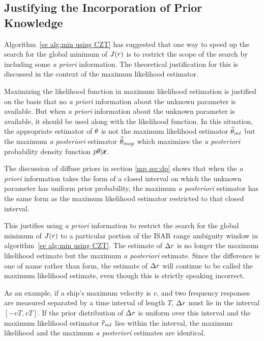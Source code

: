 \subsection{Justifying the Incorporation of Prior Knowledge}

Algorithm~\ref{ee alg:min using CZT} has suggested that one way to speed up 
the search for the global minimum of $J({r})$ is to restrict the scope of the 
search by including some {\em a priori\/} information.  The theoretical
justification for this is discussed in the context of the maximum 
likelihood estimator.

Maximizing the likelihood function in maximum likelihood estimation is
justified on the basis that no {\em a priori\/} information about the
unknown parameter is available.  But when {\em a priori\/} information about
the unknown parameter is available, it should be used along with the
likelihood function.  In this situation, the appropriate estimator
of $\theta$ is not the maximum likelihood estimator $\widehat{\theta}_{ml}$ but the maximum {\em
a posteriori\/} estimator $\widehat{\theta}_{map}$ which maximizes the {\em a posteriori\/}
probability density function ${p}{\theta|\bm{x}}$. 

The discussion of diffuse priors in section \ref{mp sec:dp} shows that when
the {\em a priori\/} information takes the form of a closed interval on
which the unknown parameter has uniform prior probability, the maximum {\em
a posteriori\/} estimator has the same form as the maximum likelihood
estimator restricted to that closed interval.

This justifies using {\em a priori\/} information to restrict the search
for the global minimum of $J({r})$ to a particular portion of the ISAR range
ambiguity window in algorithm~\ref{ee alg:min using CZT}.  The estimate of
${\Delta r}$ is no longer the maximum likelihood estimate but the maximum {\em a
posteriori\/} estimate.   Since the difference is one of name rather than
form, the estimate of ${\Delta r}$ will continue to be called the maximum likelihood
estimate, even though this is strictly speaking incorrect.

As an example, if a ship's maximum velocity is $v$, and two frequency
responses are measured separated by a time interval of length $T$, ${\Delta r}$
must lie in the interval $[-vT,vT]$.  If the prior distribution of ${\Delta r}$ is
uniform over this interval and the maximum likelihood estimator $\widehat{r}_{ml}$ lies
within the interval, the maximum likelihood and the maximum {\em a
posteriori\/} estimates are identical.

